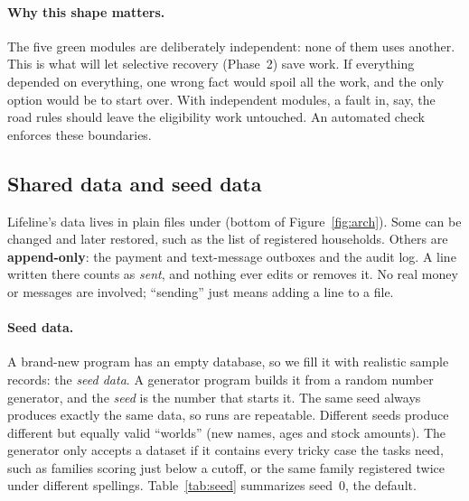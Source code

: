 \documentclass{article}
\newcommand{\code}[1]{\texttt{\detokenize{#1}}}
\begin{document}
\paragraph{Why this shape matters.} The five green modules are deliberately independent: none of them uses another. This is what will let selective recovery (Phase~2) save work. If everything depended on everything, one wrong fact would spoil all the work, and the only option would be to start over. With independent modules, a fault in, say, the road rules should leave the eligibility work untouched. An automated check enforces these boundaries.

\subsection{Shared data and seed data}
\label{sec:data}

Lifeline's data lives in plain files under \code{data/} (bottom of Figure~\ref{fig:arch}). Some can be changed and later restored, such as the list of registered households. Others are \textbf{append-only}: the payment and text-message outboxes and the audit log. A line written there counts as \emph{sent}, and nothing ever edits or removes it. No real money or messages are involved; ``sending'' just means adding a line to a file.

\paragraph{Seed data.} A brand-new program has an empty database, so we fill it with realistic sample records: the \emph{seed data}. A generator program builds it from a random number generator, and the \emph{seed} is the number that starts it. The same seed always produces exactly the same data, so runs are repeatable. Different seeds produce different but equally valid ``worlds'' (new names, ages and stock amounts). The generator only accepts a dataset if it contains every tricky case the tasks need, such as families scoring just below a cutoff, or the same family registered twice under different spellings. Table~\ref{tab:seed} summarizes seed~0, the default.
\end{document}
